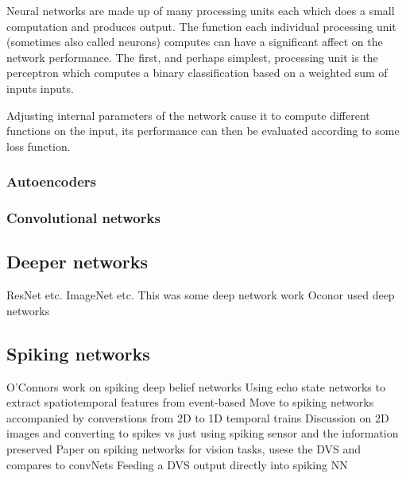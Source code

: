 Neural networks are made up of many processing units each which does a small computation and produces output. 
The function each individual processing unit (sometimes also called neurons) computes can have a significant affect on the network performance. 
The first, and perhaps simplest, processing unit is the perceptron which computes a binary classification based on a weighted sum of inputs inputs. 

Adjusting internal parameters of the network cause it to compute different functions on the input, its performance can then be evaluated according to some loss function. 




\subsubsection{Autoencoders}


\subsubsection{Convolutional networks}

\subsection{Deeper networks}   %
ResNet etc. %
ImageNet etc.
This was some deep network work \cite{pedroni2013neuromorphic}
Oconor used deep networks \cite{OConnor2013}

\subsection{Spiking networks}    %
O'Connors work on spiking deep belief networks \cite{OConnor2013}
Using echo state networks to extract spatiotemporal features from event-based \cite{lagorce2015spatiotemporal}
Move to spiking networks accompanied by converstions from 2D to 1D temporal trains \cite{afshar2013ripple}
Discussion on 2D images and converting to spikes vs just using spiking sensor and the information preserved \cite{akolkar2015can}
Paper on spiking networks for vision tasks, usese the DVS and compares to convNets \cite{martin2015spiking}
Feeding a DVS output directly into spiking NN \cite{Bichler}

